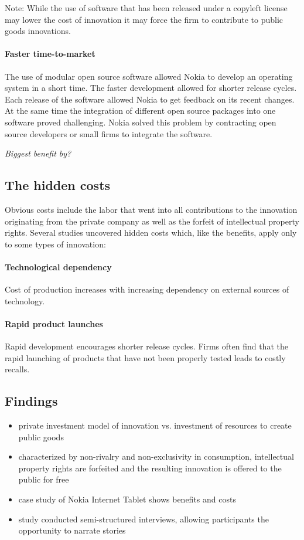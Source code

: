 \documentclass[a4paper]{scrartcl}
\newcommand{\todo}[1]{{\it \color{gray} #1}}
\begin{document}
Note: While the use of software that has been released under a copyleft license may lower the cost of innovation it may force the firm to contribute to public goods innovations.

\paragraph{Faster time-to-market}
The use of modular open source software allowed Nokia to develop an operating system in a short time. 
The faster development allowed for shorter release cycles.
Each release of the software allowed Nokia to get feedback on its recent changes.
At the same time the integration of different open source packages into one software proved challenging. 
Nokia solved this problem by contracting open source developers or small firms to integrate the software. 

\todo{Biggest benefit by?}

\subsection{The hidden costs}

Obvious costs include the labor that went into all contributions to the innovation originating from the private company as well as the forfeit of intellectual property rights.
Several studies uncovered hidden costs which, like the benefits, apply only to some types of innovation:

\paragraph{Technological dependency}
Cost of production increases with increasing dependency on external sources of technology.

\paragraph{Rapid product launches}
Rapid development encourages shorter release cycles.
Firms often find that the rapid launching of products that have not been properly tested leads
to costly recalls.


\subsection{Findings}


\begin{itemize}
\item private investment model of innovation vs. investment of resources to create public goods 
\item characterized by non-rivalry and non-exclusivity in consumption, intellectual property rights are forfeited and the resulting innovation is offered to the public for free
\item case study of Nokia Internet Tablet shows benefits and costs
\item study conducted semi-structured interviews, allowing participants the opportunity to narrate stories
\end{itemize}
\end{document}
